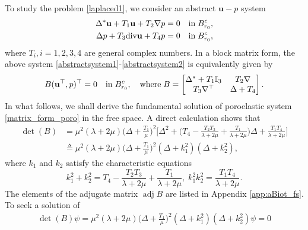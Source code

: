 \documentclass[11pt]{article}
\newcommand{\mat}{\mathbb}
\newcommand{\dive}{{\rm div}}
\newcommand{\la}{\lambda}
\begin{document}
To study the problem \eqref{laplaced1}, we consider an abstract $\mathbf{u}-p$ system
\begin{subequations}
\begin{align}\label{abstractsystem1}
\Delta^*\mathbf{u}+T_1\mathbf{u}
+T_2\nabla p=0 \quad &{\rm in} \; B_{r_0}^c,\\\label{abstractsystem2}
\Delta p+T_3\dive\mathbf{u}+T_4p=0\quad &{\rm in} \;B_{r_0}^c,
\end{align}
\end{subequations}
where $T_i,i=1,2,3,4$ are general complex numbers.
In a block matrix form, the above system \eqref{abstractsystem1}-\eqref{abstractsystem2} is equivalently 
given by
\begin{equation}\label{matrix_form_poro}
B(\mathbf{u}^{\top},p)^{\top}=0\quad {\rm in}\; B_{r_0}^c,\quad{\rm where}\;B=\begin{bmatrix}
\Delta^*+T_1\mat{I}_3 & T_2\nabla \\
T_3\nabla^{\top} & \Delta +T_4\\
\end{bmatrix}.
\end{equation}
In what follows, we shall derive the fundamental solution of poroelastic system \eqref{matrix_form_poro} 
in the free space. A direct calculation shows that 
\begin{equation}
\begin{aligned}
\det(B)&=\mu^2(\la+2\mu)\Big(\Delta+\frac{T_1}{\mu}\Big)^2\Big[\Delta^2+\Big(T_4-\frac{T_2T_3}{\la+2\mu}
+\frac{T_1}{\la+2\mu}\Big)\Delta+\frac{T_1T_4}{\la+2\mu}\Big] \\
&\triangleq\mu^2(\la+2\mu)\Big(\Delta+\frac{T_1}{\mu}\Big)^2(\Delta+k_1^2)(\Delta+k_2^2),
\end{aligned}
\end{equation}
where $k_1$ and $k_2$ satisfy the characteristic equations
\begin{equation}\label{charac1}
k_1^2+k_2^2=T_4-\frac{T_2T_3}{\la+2\mu}+\frac{T_1}{\la+2\mu},\;k_1^2k_2^2=\frac{T_1T_4}{\la+2\mu}.
\end{equation}
The elements of the adjugate matrix $\operatorname{adj}B$ are listed in Appendix \ref{app:aBiot_fs}.
To seek a solution of
\begin{equation}\label{det_B}
\begin{aligned}
\det(B)\psi=\mu^2(\la+2\mu)\Big(\Delta+\frac{T_1}{\mu}\Big)^2(\Delta+k_1^2)(\Delta+k_2^2)\psi =0
\end{aligned}
\end{equation}
\end{document}
